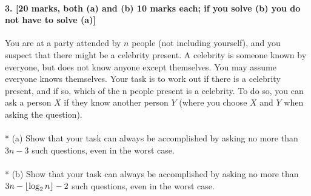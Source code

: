 \documentclass[a4paper]{scrartcl}
\begin{document}
\paragraph{3. [20 marks, both (a) and (b) 10 marks each; if you solve (b) you do not have to
solve (a)]}
\label{sec:Question 3}
You are at a party attended by $n$ people (not including yourself), and you suspect that there might be a celebrity present. A celebrity is someone known by everyone, but does not know anyone except themselves. You may assume everyone knows themselves. Your task is to work out if there is a celebrity present, and if so, which of the n people present is a celebrity. To do so, you can ask a person $X$ if they know another person $Y$ (where you choose $X$ and $Y$ when asking the question).\\
\\*
(a) Show that your task can always be accomplished by asking no more than $3n-3$ such questions, even in the worst case.\\
\\*
(b) Show that your task can always be accomplished by asking no more than $3n-\left\lfloor \log_2{n} \right\rfloor-2$ such questions, even in the worst case.
\end{document}

